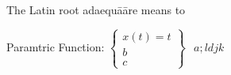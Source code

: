 \message{ !name(dum.tex)}\documentclass{article}
\newcommand{\ParamEq}[3]
{
  \left\{
    \begin{array}{c}
    {#1}\\
    {#2}\\
    {#3}
    \end{array}
  \right\}
}
\begin{document}


The Latin root adaequā\={a}re means to
  
Paramtric Function: $\ParamEq{x(t)=t}{b}{c}$
$
\begin{array}{c}
  a;ldjk
\end{array}
$
\end{document}
